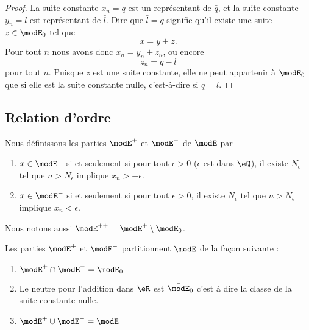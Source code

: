 \begin{proof}
	La suite constante \( x_n=q\) est un représentant de \( \bar q\), et la suite constante \( y_n=l\) est représentant de \( \bar l\). Dire que \( \bar l=\bar q\) signifie qu'il existe une suite \( z\in \modE_0\) tel que
	\begin{equation}
		x=y+z.
	\end{equation}
	Pour tout \( n\) nous avons donc \( x_n=y_n+z_n\), ou encore
	\begin{equation}
		z_n=q-l
	\end{equation}
	pour tout \( n\). Puisque \( z\) est une suite constante, elle ne peut appartenir à \( \modE_0\) que si elle est la suite constante nulle, c'est-à-dire si \( q=l\).
\end{proof}

\subsection{Relation d'ordre}

\begin{definition}
	Nous définissons les parties \( \modE^+\) et \( \modE^-\) de \( \modE\) par
	\begin{enumerate}
		\item
		      \( x\in  \modE^+\) si et seulement si pour tout \( \epsilon>0\) (\( \epsilon\) est dans \( \eQ\)), il existe \( N_{\epsilon}\) tel que \( n>N_{\epsilon}\) implique \( x_n>-\epsilon\).
		\item
		      \( x\in  \modE^-\) si et seulement si pour tout \( \epsilon>0\), il existe \( N_{\epsilon}\) tel que \( n>N_{\epsilon}\) implique \( x_n<\epsilon\).
	\end{enumerate}
	Nous notons aussi \( \modE^{++}=\modE^+\setminus\modE_0\).
\end{definition}


\begin{lemma}       \label{LEMooJOYQooCDlhHW}
	Les parties \( \modE^+\) et \( \modE^-\) partitionnent \( \modE\) de la façon suivante :
	\begin{enumerate}
		\item   \label{ITEMooKRBYooZGhhch}
		      \( \modE^+\cap\modE^-=\modE_0 \)
		\item       \label{ITEMooRCIZooHUIymE}
		      Le neutre pour l'addition dans \( \eR\) est \( \bar\modE_0\) c'est à dire la classe de la suite constante nulle.
		\item       \label{ITEMooZRVXooANHspZ}
		      \( \modE^+\cup\modE^-=\modE\)
	\end{enumerate}
\end{lemma}

